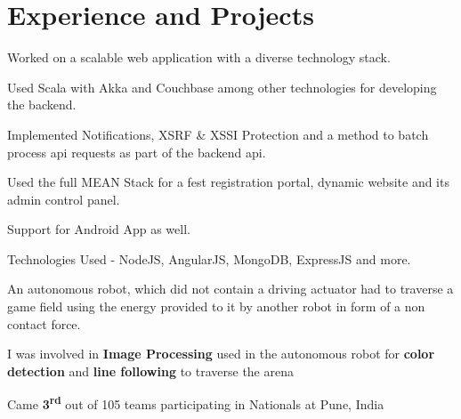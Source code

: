 \documentclass[]{deedy-resume-openfont}
\begin{document}
\begin{minipage}[t]{0.66\textwidth} 


\section{Experience and Projects}
\vspace{\topsep} %
\begin{tightemize}
  \item Worked on a scalable web application with a diverse technology stack.
  \item Used Scala with Akka and Couchbase among other technologies for
    developing the backend.
  \item	Implemented Notifications, XSRF \& XSSI Protection and a method
    to batch process api requests as part of the backend api.
\end{tightemize}

\begin{tightemize}
  \item Used the full MEAN Stack for a fest registration portal, dynamic website
    and its admin control panel.
  \item Support for Android App as well.
  \item Technologies Used - NodeJS, AngularJS, MongoDB, ExpressJS and more.
\end{tightemize}

\begin{tightemize}
  \item An autonomous robot, which did not contain a driving actuator had to
    traverse a game field using the energy provided to it by another robot in
    form of a non contact force.
  \item I was involved in \textbf{Image Processing} used in the autonomous
    robot for \textbf{color detection} and \textbf{line following} to traverse the arena
  \item Came \textbf{3\textsuperscript{rd}} out of 105 teams participating in Nationals at Pune, India
\end{tightemize}


\end{minipage}
\end{document}
